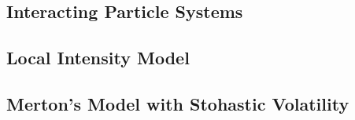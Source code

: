 \subsection{Interacting Particle Systems}

\subsection{Local Intensity Model}

\subsection{Merton's Model with Stohastic Volatility}

